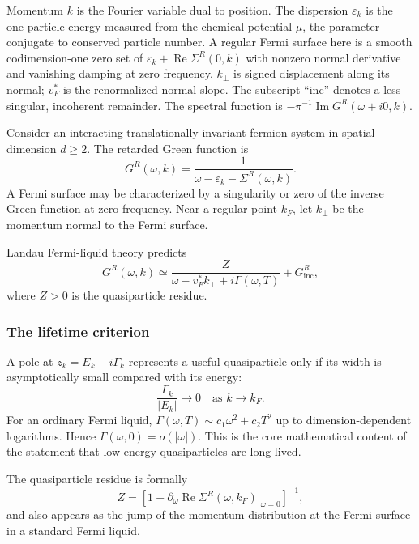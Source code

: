 \documentclass[11pt]{article}
\numberwithin{equation}{section}
\theoremstyle{exposition}
\theoremstyle{result}
\begin{document}
Momentum $k$ is the Fourier variable dual to position. The dispersion $\varepsilon_k$ is the one-particle energy measured from the chemical potential $\mu$, the parameter conjugate to conserved particle number. A regular Fermi surface here is a smooth codimension-one zero set of $\varepsilon_k+\operatorname{Re}\Sigma^R(0,k)$ with nonzero normal derivative and vanishing damping at zero frequency. $k_\perp$ is signed displacement along its normal; $v_F^*$ is the renormalized normal slope. The subscript ``inc'' denotes a less singular, incoherent remainder. The spectral function is $-\pi^{-1}\operatorname{Im}G^R(\omega+i0,k)$.

Consider an interacting translationally invariant fermion system in spatial dimension $d\ge2$. The retarded Green function is
\begin{equation}
G^R(\omega,k)
=\frac1{\omega-\varepsilon_{k}-\Sigma^R(\omega,k)}.
\label{eq:retarded}
\end{equation}
A Fermi surface may be characterized by a singularity or zero of the inverse Green function at zero frequency. Near a regular point $k_F$, let $k_\perp$ be the momentum normal to the Fermi surface.

Landau Fermi-liquid theory predicts
\begin{equation}
G^R(\omega,k)
\simeq
\frac{Z}{\omega-v_F^*k_\perp+i\Gamma(\omega,T)}
+G^R_{\mathrm{inc}},
\label{eq:FLpole}
\end{equation}
where $Z>0$ is the quasiparticle residue.

\subsubsection{The lifetime criterion}

A pole at $z_{k}=E_{k}-i\Gamma_{k}$ represents a useful quasiparticle only if its width is asymptotically small compared with its energy:
\begin{equation}
\frac{\Gamma_{k}}{|E_{k}|}\longrightarrow0
\quad\text{as }k\to k_F.
\label{eq:qpcriterion}
\end{equation}
For an ordinary Fermi liquid, $\Gamma(\omega,T)\sim c_1\omega^2+c_2T^2$ up to dimension-dependent logarithms. Hence $\Gamma(\omega,0)=o(|\omega|)$. This is the core mathematical content of the statement that low-energy quasiparticles are long lived.

The quasiparticle residue is formally
\begin{equation*}
Z=
\left[
1-\partial_\omega\operatorname{Re}\Sigma^R(\omega,k_F)|_{\omega=0}
\right]^{-1},
\end{equation*}
and also appears as the jump of the momentum distribution at the Fermi surface in a standard Fermi liquid.
\end{document}
